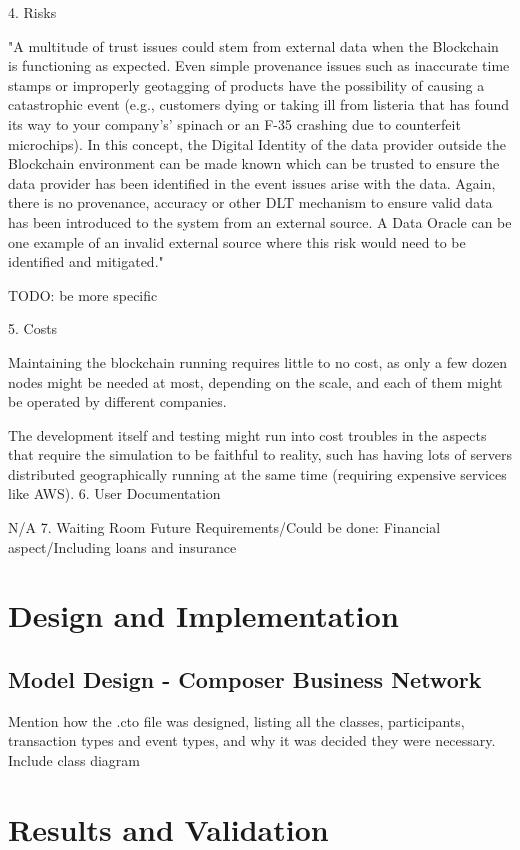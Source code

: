 {	4. Risks
		\par "A multitude of trust issues could stem from external data when the Blockchain is functioning as expected. Even simple provenance issues such as inaccurate time stamps or improperly geotagging of products have the possibility of causing a catastrophic event (e.g., customers dying or taking ill from listeria that has found its way to your company's’ spinach or an F-35 crashing due to counterfeit microchips). In this concept, the Digital Identity of the data provider outside the Blockchain environment can be made known which can be trusted to ensure the data provider has been identified in the event issues arise with the data. Again, there is no provenance, accuracy or other DLT mechanism to ensure valid data has been introduced to the system from an external source. A Data Oracle can be one example of an invalid external source where this risk would need to be identified and mitigated."
		\par TODO: be more specific
		
	5. Costs
		\par Maintaining the blockchain running requires little to no cost, as only a few dozen nodes might be needed at most, depending on the scale, and each of them might be operated by different companies.
		\par The development itself and testing might run into cost troubles in the aspects that require the simulation to be faithful to reality, such has having lots of servers distributed geographically running at the same time (requiring expensive services like AWS).
	6. User Documentation
		\par N/A
	7. Waiting Room
Future Requirements/Could be done: Financial aspect/Including loans and insurance

\section{Design and Implementation}
\subsection{Model Design - Composer Business Network}
Mention how the .cto file was designed, listing all the classes, participants, transaction types and event types, and why it was decided they were necessary. Include class diagram

\section{Results and Validation}

}
